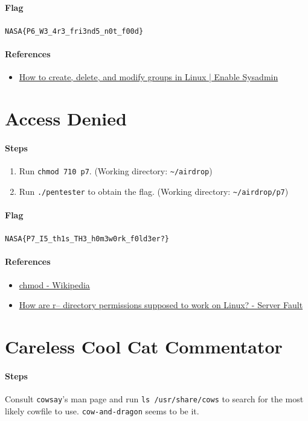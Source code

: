 \documentclass[12pt, a4paper]{article}
\begin{document}
  \paragraph{Flag} \verb|NASA{P6_W3_4r3_fri3nd5_n0t_f00d}|
  \paragraph{References}
  \begin{itemize}
    \item \href{https://www.redhat.com/sysadmin/linux-groups}{How to create, delete, and modify groups in Linux | Enable Sysadmin}
  \end{itemize}

  \section{Access Denied}
  \paragraph{Steps}
  \begin{enumerate}
    \item Run \verb|chmod 710 p7|. (Working directory: \verb|~/airdrop|)
    \item Run \verb|./pentester| to obtain the flag.
      (Working directory: \verb|~/airdrop/p7|)
  \end{enumerate}
  \paragraph{Flag} \verb|NASA{P7_I5_th1s_TH3_h0m3w0rk_f0ld3er?}|
  \paragraph{References}
  \begin{itemize}
    \item \href{https://en.wikipedia.org/wiki/Chmod}{chmod - Wikipedia}
    \item \href{https://serverfault.com/questions/428885/how-are-r-directory-permissions-supposed-to-work-on-linux}{How are r-- directory permissions supposed to work on Linux? - Server Fault}
  \end{itemize}

  \section{Careless Cool Cat Commentator}
  \paragraph{Steps}
  Consult \verb|cowsay|'s man page and run \verb|ls /usr/share/cows| to search
  for the most likely cowfile to use. \verb|cow-and-dragon| seems to be it.
\end{document}
